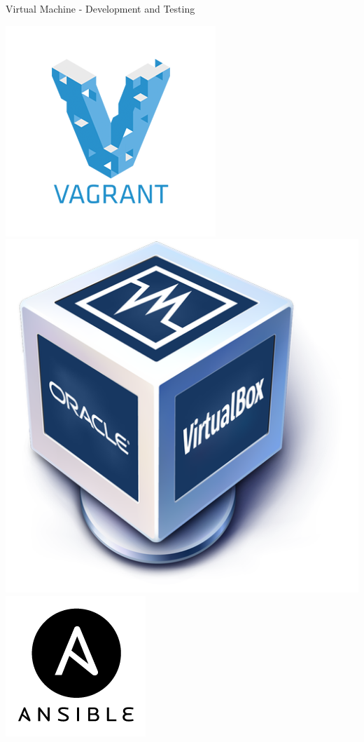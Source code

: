 \documentclass[12pt]{beamer}
\begin{document}
\begin{frame}[fragile]{Virtual Machine - Development and Testing}
	\begin{center}
		\includegraphics[keepaspectratio=true,height=0.4\textheight]{images/vagrant.png}
		\includegraphics[keepaspectratio=true,height=0.4\textheight]{images/virtualbox.png}
		\includegraphics[keepaspectratio=true,height=0.4\textheight]{images/ansible.png}
	\end{center}


\end{frame}
\end{document}

